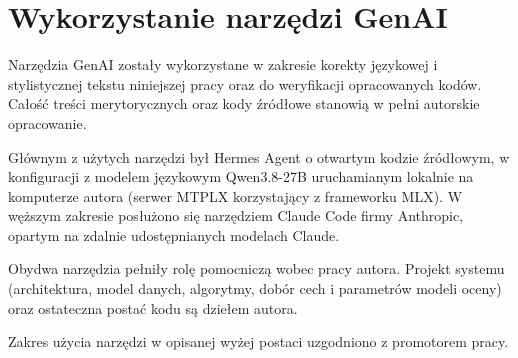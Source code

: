 \newpage
\section{Wykorzystanie narzędzi GenAI}
Narzędzia GenAI zostały wykorzystane w zakresie korekty językowej i stylistycznej
tekstu niniejszej pracy oraz do weryfikacji opracowanych kodów. Całość treści merytorycznych
oraz kody źródłowe stanowią w pełni autorskie opracowanie.

Głównym z użytych narzędzi był Hermes Agent o otwartym kodzie źródłowym, w konfiguracji
z modelem językowym Qwen3.8-27B uruchamianym lokalnie na komputerze autora (serwer MTPLX
korzystający z frameworku MLX). W węższym zakresie posłużono się narzędziem Claude Code firmy
Anthropic, opartym na zdalnie udostępnianych modelach Claude.

Obydwa narzędzia pełniły rolę pomocniczą wobec pracy autora. Projekt systemu (architektura,
model danych, algorytmy, dobór cech i parametrów modeli oceny) oraz ostateczna postać kodu
są dziełem autora.

Zakres użycia narzędzi w opisanej wyżej postaci uzgodniono z promotorem pracy.
